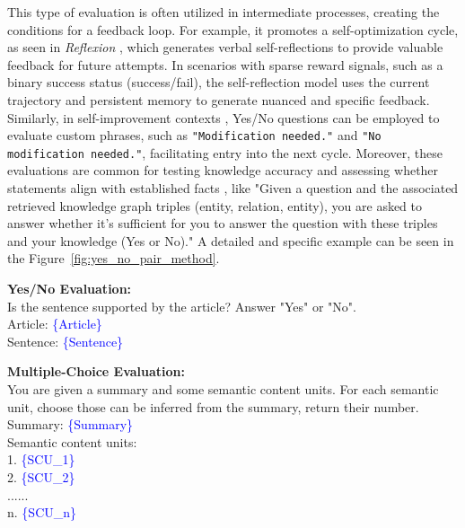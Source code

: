 This type of evaluation is often utilized in intermediate processes, creating the conditions for a feedback loop. For example, it promotes a self-optimization cycle, as seen in \textit{Reflexion} \citep{nips_reflexion}, which generates verbal self-reflections to provide valuable feedback for future attempts. In scenarios with sparse reward signals, such as a binary success status (success/fail), the self-reflection model uses the current trajectory and persistent memory to generate nuanced and specific feedback.
Similarly, in self-improvement contexts \citep{ucla_creativity_macgyver}, Yes/No questions can be employed to evaluate custom phrases, such as \texttt{"Modification needed."} and \texttt{"No modification needed."}, facilitating entry into the next cycle.
Moreover, these evaluations are common for testing knowledge accuracy and assessing whether statements align with established facts \citep{think_on_graph}, like "Given a question and the associated retrieved knowledge graph triples (entity, relation, entity), you are asked to answer whether it's sufficient for you to answer the question with these triples and your knowledge (Yes or No)." A detailed and specific example can be seen in the Figure~\ref{fig:yes_no_pair_method}.

    

    

\begin{tcolorbox}[colback=gray!10, colframe=gray!90!black, title={Evaluation Prompt Templates for Yes/No and Multiple-Choice Tasks}]
\textbf{Yes/No Evaluation:}\\
Is the sentence supported by the article? Answer "Yes" or "No".\\
Article: \textcolor{blue}{\{Article\}} \\
Sentence: \textcolor{blue}{\{Sentence\}}

\vspace{6pt}
\textbf{Multiple-Choice Evaluation:}\\
You are given a summary and some semantic content units. For each semantic unit, choose those can be inferred from the summary, return their number.\\
Summary: \textcolor{blue}{\{Summary\}} \\
Semantic content units: \\
1. \textcolor{blue}{\{SCU\_1\}} \\
2. \textcolor{blue}{\{SCU\_2\}} \\
...... \\
n. \textcolor{blue}{\{SCU\_n\}}
\end{tcolorbox}







